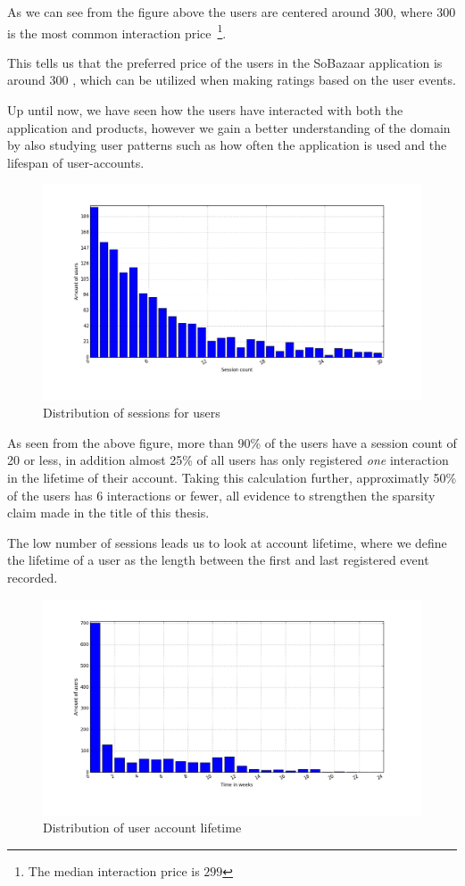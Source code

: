 As we can see from the figure above the users are centered around $300$, where
$300$ is the most common interaction price~\footnote{The median interaction
price is $299$}.

This tells us that the preferred price of the users in the SoBazaar application
is around $300$ , which can be utilized when making ratings based on the user
events.

Up until now, we have seen how the users have interacted with both the
application and products, however we gain a better understanding of the domain
by also studying user patterns such as how often the application is used and
the lifespan of user-accounts.

\begin{figure}[H]
  \includegraphics[width=5in]{image/sessiondistribution.png}
  \centering
  \caption{Distribution of sessions for users}
  \label{fig:sessCountDist}
\end{figure}

As seen from the above figure, more than 90\% of the users have a session count
of 20 or less, in addition almost 25\% of all users has only registered
\textit{one} interaction in the lifetime of their account. Taking this
calculation further, approximatly 50\% of the users has 6 interactions or fewer, all
evidence to strengthen the sparsity claim made in the title of this thesis.

The low number of sessions leads us to look at account lifetime, where we
define the lifetime of a user as the length between the first and last
registered event recorded.

\begin{figure}[H]
  \includegraphics[width=5in]{image/userTimespansdistribution.png}
  \centering
  \caption{Distribution of user account lifetime}
  \label{figure:userTimespandist}
\end{figure}

